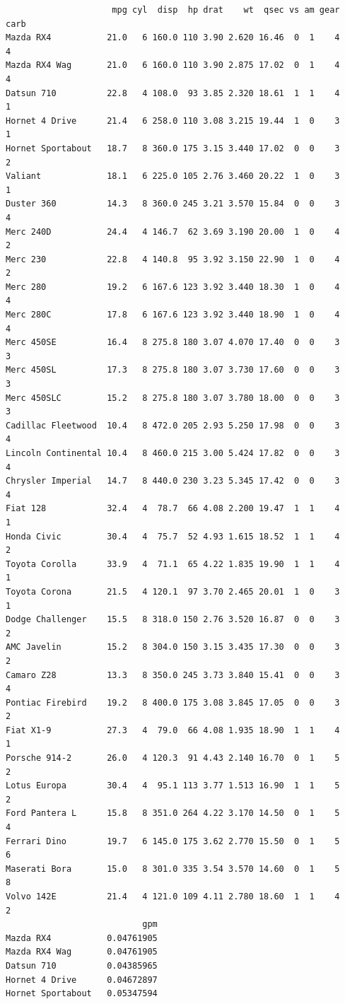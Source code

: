 \documentclass[
  letterpaper,
  DIV=11,
  numbers=noendperiod]{scrreprt}
\begin{document}
\begin{verbatim}
                     mpg cyl  disp  hp drat    wt  qsec vs am gear carb
Mazda RX4           21.0   6 160.0 110 3.90 2.620 16.46  0  1    4    4
Mazda RX4 Wag       21.0   6 160.0 110 3.90 2.875 17.02  0  1    4    4
Datsun 710          22.8   4 108.0  93 3.85 2.320 18.61  1  1    4    1
Hornet 4 Drive      21.4   6 258.0 110 3.08 3.215 19.44  1  0    3    1
Hornet Sportabout   18.7   8 360.0 175 3.15 3.440 17.02  0  0    3    2
Valiant             18.1   6 225.0 105 2.76 3.460 20.22  1  0    3    1
Duster 360          14.3   8 360.0 245 3.21 3.570 15.84  0  0    3    4
Merc 240D           24.4   4 146.7  62 3.69 3.190 20.00  1  0    4    2
Merc 230            22.8   4 140.8  95 3.92 3.150 22.90  1  0    4    2
Merc 280            19.2   6 167.6 123 3.92 3.440 18.30  1  0    4    4
Merc 280C           17.8   6 167.6 123 3.92 3.440 18.90  1  0    4    4
Merc 450SE          16.4   8 275.8 180 3.07 4.070 17.40  0  0    3    3
Merc 450SL          17.3   8 275.8 180 3.07 3.730 17.60  0  0    3    3
Merc 450SLC         15.2   8 275.8 180 3.07 3.780 18.00  0  0    3    3
Cadillac Fleetwood  10.4   8 472.0 205 2.93 5.250 17.98  0  0    3    4
Lincoln Continental 10.4   8 460.0 215 3.00 5.424 17.82  0  0    3    4
Chrysler Imperial   14.7   8 440.0 230 3.23 5.345 17.42  0  0    3    4
Fiat 128            32.4   4  78.7  66 4.08 2.200 19.47  1  1    4    1
Honda Civic         30.4   4  75.7  52 4.93 1.615 18.52  1  1    4    2
Toyota Corolla      33.9   4  71.1  65 4.22 1.835 19.90  1  1    4    1
Toyota Corona       21.5   4 120.1  97 3.70 2.465 20.01  1  0    3    1
Dodge Challenger    15.5   8 318.0 150 2.76 3.520 16.87  0  0    3    2
AMC Javelin         15.2   8 304.0 150 3.15 3.435 17.30  0  0    3    2
Camaro Z28          13.3   8 350.0 245 3.73 3.840 15.41  0  0    3    4
Pontiac Firebird    19.2   8 400.0 175 3.08 3.845 17.05  0  0    3    2
Fiat X1-9           27.3   4  79.0  66 4.08 1.935 18.90  1  1    4    1
Porsche 914-2       26.0   4 120.3  91 4.43 2.140 16.70  0  1    5    2
Lotus Europa        30.4   4  95.1 113 3.77 1.513 16.90  1  1    5    2
Ford Pantera L      15.8   8 351.0 264 4.22 3.170 14.50  0  1    5    4
Ferrari Dino        19.7   6 145.0 175 3.62 2.770 15.50  0  1    5    6
Maserati Bora       15.0   8 301.0 335 3.54 3.570 14.60  0  1    5    8
Volvo 142E          21.4   4 121.0 109 4.11 2.780 18.60  1  1    4    2
                           gpm
Mazda RX4           0.04761905
Mazda RX4 Wag       0.04761905
Datsun 710          0.04385965
Hornet 4 Drive      0.04672897
Hornet Sportabout   0.05347594

\end{verbatim}
\end{document}
